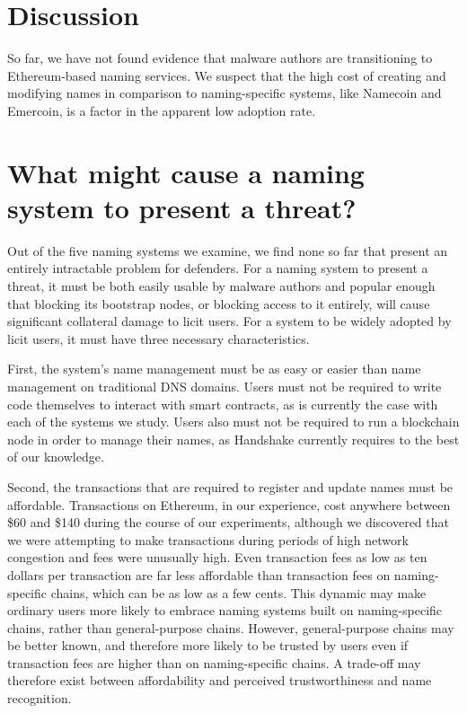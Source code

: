 \section{Discussion}

So far, we have not found evidence that malware authors are 
transitioning to Ethereum-based naming services. We suspect that the high 
cost of creating and modifying names in comparison to naming-specific systems, 
like Namecoin and Emercoin, is a 
factor in the apparent low adoption rate. 


\section{What might cause a naming system to present a threat?}

Out of the five naming systems we examine, we find none so far that present an 
entirely intractable problem for defenders. For a naming system to present a  
threat, it must be both easily usable by malware authors and 
popular enough that blocking its bootstrap nodes, or blocking 
access to it entirely, will cause significant collateral damage to licit users.
For a system to be widely adopted by licit users, it must have three necessary 
characteristics. 

First, the system's name management must be as 
easy or easier than name management on traditional DNS domains. Users must not 
be required to write 
code themselves to interact with smart contracts, as is currently the case with 
each of the systems we 
study. Users also must not be required to run a blockchain node in order to 
manage their names, as 
Handshake currently requires to the best of our knowledge.

Second, the transactions that are required to register and update names must be 
affordable. 
Transactions on Ethereum, in our experience, cost anywhere between \$60 and 
\$140 during the course of 
our experiments, although we discovered that we were attempting to make 
transactions during periods of 
high network congestion and fees were unusually high. Even transaction fees as 
low as ten dollars per 
transaction are far less affordable than transaction fees on naming-specific 
chains, which can be as 
low as a few cents. This dynamic may make ordinary users more likely to embrace 
naming systems built 
on naming-specific chains, rather than general-purpose chains. However, 
general-purpose chains may be 
better known, and therefore more likely to be trusted by users even if 
transaction fees are higher 
than on naming-specific chains. A trade-off may therefore exist between 
affordability and perceived 
trustworthiness and name recognition. 

